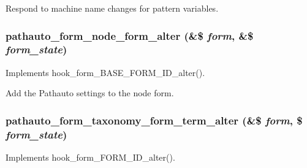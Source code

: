 Respond to machine name changes for pattern variables. \hypertarget{pathauto_8module_acfdd05981fd465c6ed43d0670b02990b}{
\subsubsection[{pathauto\_\-form\_\-node\_\-form\_\-alter}]{\setlength{\rightskip}{0pt plus 5cm}pathauto\_\-form\_\-node\_\-form\_\-alter (\&\$ {\em form}, \/  \&\$ {\em form\_\-state})}}
\label{pathauto_8module_acfdd05981fd465c6ed43d0670b02990b}
Implements hook\_\-form\_\-BASE\_\-FORM\_\-ID\_\-alter().

Add the Pathauto settings to the node form. \hypertarget{pathauto_8module_aa7283f26358021e712eed8d287d1799d}{
\subsubsection[{pathauto\_\-form\_\-taxonomy\_\-form\_\-term\_\-alter}]{\setlength{\rightskip}{0pt plus 5cm}pathauto\_\-form\_\-taxonomy\_\-form\_\-term\_\-alter (\&\$ {\em form}, \/  \$ {\em form\_\-state})}}
\label{pathauto_8module_aa7283f26358021e712eed8d287d1799d}
Implements hook\_\-form\_\-FORM\_\-ID\_\-alter().

